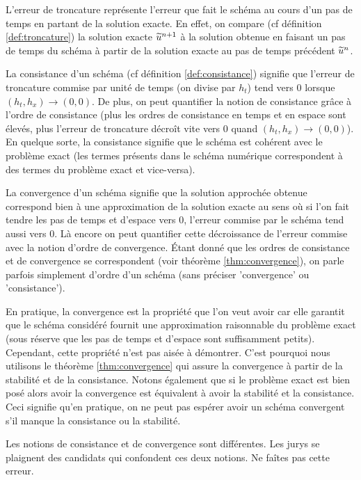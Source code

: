 \documentclass[12pt,a4paper,twoside]{article}
\begin{document}
L'erreur de troncature repr\'esente l'erreur que fait le sch\'ema
au cours d'un pas de temps en partant de la solution exacte.
En effet, on compare (cf d\'efinition \ref{def:troncature})
la solution exacte $\widetilde{u}^{n+1}$ \`a la solution 
obtenue en faisant un pas de temps du sch\'ema
\`a partir de la solution exacte au pas de temps
pr\'ec\'edent $\widetilde{u}^{n}$.


La consistance d'un sch\'ema (cf d\'efinition \ref{def:consistance})
signifie que l'erreur de troncature commise par unit\'e de temps
(on divise par $h_t$) tend vers $0$ lorsque $(h_t,h_x) \to (0,0)$.
De plus, on peut quantifier la notion de consistance
gr\^ace \`a l'ordre de consistance 
(plus les ordres de consistance en temps et en espace sont \'elev\'es,
plus l'erreur de troncature d\'ecro\^it vite vers $0$ quand $(h_t,h_x) \to (0,0)$).
En quelque sorte, la consistance signifie que le sch\'ema est
coh\'erent avec le probl\`eme exact 
(les termes pr\'esents dans le sch\'ema num\'erique correspondent
\`a des termes du probl\`eme exact et vice-versa).


La convergence d'un sch\'ema signifie que la solution approch\'ee obtenue
correspond bien \`a une approximation de la solution exacte
au sens o\`u si l'on fait tendre les pas de temps et d'espace vers
$0$, l'erreur commise par le sch\'ema tend aussi vers $0$.
L\`a encore on peut quantifier cette d\'ecroissance de l'erreur commise 
avec la notion d'ordre de convergence.
\'Etant donn\'e que les ordres de consistance et de convergence 
se correspondent (voir th\'eor\`eme \ref{thm:convergence}), 
on parle parfois simplement d'ordre d'un sch\'ema
(sans pr\'eciser 'convergence' ou 'consistance').


En pratique, la convergence est la propri\'et\'e que l'on veut avoir
car elle garantit que le sch\'ema consid\'er\'e fournit une approximation
raisonnable du probl\`eme exact (sous r\'eserve que les pas de temps
et d'espace sont suffisamment petits).
Cependant, cette propri\'et\'e n'est pas ais\'ee \`a d\'emontrer.
C'est pourquoi nous utilisons le th\'eor\`eme \ref{thm:convergence}
qui assure la convergence \`a partir de la stabilit\'e et 
de la consistance.
Notons \'egalement que si le probl\`eme exact est bien pos\'e
alors avoir la convergence est \'equivalent \`a avoir
la stabilit\'e et la consistance.
Ceci signifie qu'en pratique, on ne peut pas esp\'erer avoir un sch\'ema convergent
s'il manque la consistance ou la stabilit\'e.


\begin{remark}
  Les notions de consistance et de convergence sont diff\'erentes.
  Les jurys se plaignent des candidats qui confondent ces deux
  notions.
  Ne fa\^ites pas cette erreur.
\end{remark}
\end{document}
